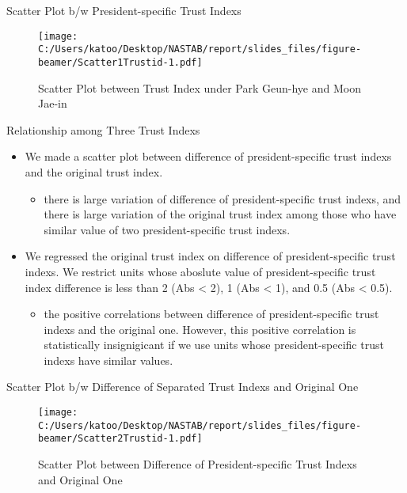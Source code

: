 \documentclass[
  ignorenonframetext,
]{beamer}
\providecommand{\tightlist}{%
  \setlength{\itemsep}{0pt}\setlength{\parskip}{0pt}}
\begin{document}
\begin{frame}{Scatter Plot b/w President-specific Trust Indexs}
\protect\hypertarget{scatter-plot-bw-president-specific-trust-indexs}{}
\begin{figure}
\centering
\texttt{[image: C:/Users/katoo/Desktop/NASTAB/report/slides\_files/figure-beamer/Scatter1Trustid-1.pdf]}
\caption{Scatter Plot between Trust Index under Park Geun-hye and Moon
Jae-in}
\end{figure}
\end{frame}

\begin{frame}{Relationship among Three Trust Indexs}
\protect\hypertarget{relationship-among-three-trust-indexs}{}
\begin{itemize}
\tightlist
\item
  We made a scatter plot between difference of president-specific trust
  indexs and the original trust index.

  \begin{itemize}
  \tightlist
  \item
    there is large variation of difference of president-specific trust
    indexs, and there is large variation of the original trust index
    among those who have similar value of two president-specific trust
    indexs.
  \end{itemize}
\item
  We regressed the original trust index on difference of
  president-specific trust indexs. We restrict units whose aboslute
  value of president-specific trust index difference is less than 2 (Abs
  \textless{} 2), 1 (Abs \textless{} 1), and 0.5 (Abs \textless{} 0.5).

  \begin{itemize}
  \tightlist
  \item
    the positive correlations between difference of president-specific
    trust indexs and the original one. However, this positive
    correlation is statistically insignigicant if we use units whose
    president-specific trust indexs have similar values.
  \end{itemize}
\end{itemize}
\end{frame}

\begin{frame}{Scatter Plot b/w Difference of Separated Trust Indexs and
Original One}
\protect\hypertarget{scatter-plot-bw-difference-of-separated-trust-indexs-and-original-one}{}
\begin{figure}
\centering
\texttt{[image: C:/Users/katoo/Desktop/NASTAB/report/slides\_files/figure-beamer/Scatter2Trustid-1.pdf]}
\caption{Scatter Plot between Difference of President-specific Trust
Indexs and Original One}
\end{figure}
\end{frame}
\end{document}
